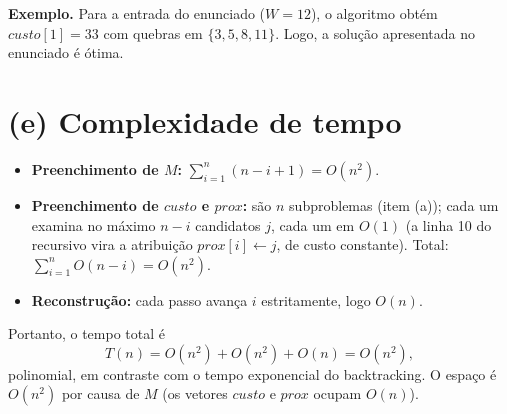 \documentclass[11pt,a4paper]{article}
\begin{document}
\noindent\textbf{Exemplo.} Para a entrada do enunciado ($W=12$), o algoritmo
obtém $\mathit{custo}[1]=33$ com quebras em $\{3,5,8,11\}$. Logo, a solução
apresentada no enunciado é ótima.

\section*{(e) Complexidade de tempo}

\begin{itemize}
  \item \textbf{Preenchimento de $M$:} $\sum_{i=1}^{n}(n-i+1) = O(n^2)$.
  \item \textbf{Preenchimento de $\mathit{custo}$ e $\mathit{prox}$:} são $n$
        subproblemas (item (a)); cada um examina no máximo $n-i$ candidatos $j$,
        cada um em $O(1)$ (a linha 10 do recursivo vira a atribuição
        $\mathit{prox}[i]\gets j$, de custo constante). Total:
        $\sum_{i=1}^{n} O(n-i) = O(n^2)$.
  \item \textbf{Reconstrução:} cada passo avança $i$ estritamente, logo $O(n)$.
\end{itemize}
Portanto, o tempo total é
\[ T(n) = O(n^2) + O(n^2) + O(n) = O(n^2), \]
polinomial, em contraste com o tempo exponencial do backtracking. O espaço é
$O(n^2)$ por causa de $M$ (os vetores $\mathit{custo}$ e $\mathit{prox}$ ocupam $O(n)$).
\end{document}
